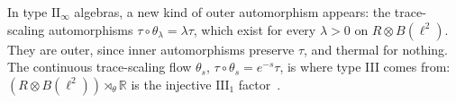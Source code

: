 \documentclass[a4paper,11pt]{article}
\theoremstyle{definition}
\begin{document}






In type $\mathrm{II}_\infty$ algebras, a new kind of outer automorphism appears: the trace-scaling automorphisms $\tau\circ\theta_\lambda=\lambda\tau$, which exist for every $\lambda>0$ on $R\otimes B(\ell^2)$. They are outer, since inner automorphisms preserve $\tau$, and thermal for nothing. The continuous trace-scaling flow $\theta_s$, $\tau\circ\theta_s=e^{-s}\tau$, is where type III comes from: $(R\otimes B(\ell^2))\rtimes_\theta\mathbb R$ is the injective $\mathrm{III}_1$ factor~\cite{ConnesTakesaki1977,Haagerup1987}.
\end{document}
